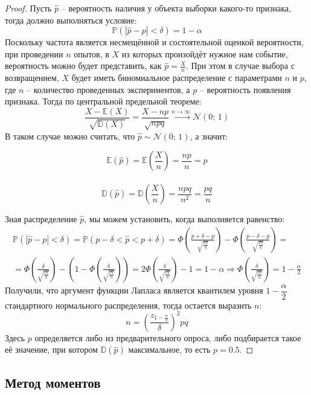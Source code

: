 \documentclass[12pt]{article}
\theoremstyle{definition}
\newcommand{\E}{\mathbb{E}}
\newcommand{\D}{\mathbb{D}}
\newcommand{\prob}{\mathbb{P}}
\newcommand{\nd}{\mathcal{N}}
\begin{document}
\begin{proof}
    Пусть $\hat{p}$ – вероятность наличия у объекта выборки какого-то признака, тогда должно выполняться условие:
    $$\prob(|\hat{p}-p|<\delta)=1-\alpha$$
    Поскольку частота является несмещённой и состоятельной оценкой вероятности, при проведении $n$ опытов, в $X$ из которых произойдёт нужное нам событие, вероятность можно будет представить, как $\hat{p}=\frac{X}{n}$. При этом в случае выбора с возвращением, $X$ будет иметь биномиальное распределение с параметрами $n$ и $p$, где $n$ – количество проведенных экспериментов, а $p$ – вероятность появления признака. Тогда по центральной предельной теореме:
    $$\frac{X-\E(X)}{\sqrt{\D(X)}}=\frac{X-np}{\sqrt{npq}}\xrightarrow{n\to\infty}\nd(0;\,1)$$
    В таком случае можно считать, что $\hat{p}\sim\nd(0;\,1)$, а значит:
    \begin{center}
        \begin{multicols}{2}
            \[\E(\hat{p})=\E\left(\frac{X}{n}\right)=\frac{np}{n}=p\]\\
            \[\D(\hat{p})=\D\left(\frac{X}{n}\right)=\frac{npq}{n^2}=\frac{pq}{n}\]
        \end{multicols}
    \end{center}
    Зная распределение $\hat{p}$, мы можем установить, когда выполняется равенство:
    \begin{multline*}
        \prob(|\hat{p}-p|<\delta)=\prob(p-\delta<\hat{p}<p+\delta)=\Phi\left(\frac{p+\delta-p}{\sqrt{\frac{pq}{n}}}\right) - \Phi\left(\frac{p-\delta-p}{\sqrt{\frac{pq}{n}}}\right)=\\
        =\Phi\left(\frac{\delta}{\sqrt{\frac{pq}{n}}}\right) - \left(1 - \Phi\left(\frac{\delta}{\sqrt{\frac{pq}{n}}}\right)\right)=2\Phi\left(\frac{\delta}{\sqrt{\frac{pq}{n}}}\right)-1=1-\alpha\Longrightarrow \Phi\left(\frac{\delta}{\sqrt{\frac{pq}{n}}}\right) = 1-\frac{\alpha}{2}
    \end{multline*}
    Получили, что аргумент функции Лапласа является квантилем уровня $1-\dfrac{\alpha}{2}$ стандартного нормального распределения, тогда остается выразить $n$:
    $$n=\left(\frac{z_{1-\frac{\alpha}{2}}}{\delta}\right)^2pq$$
    Здесь $p$ определяется либо из предварительного опроса, либо подбирается такое её значение, при котором $\D(\hat{p})$ максимальное, то есть $p=\num{0.5}$.
\end{proof}

\subsection{Метод моментов}
\end{document}
